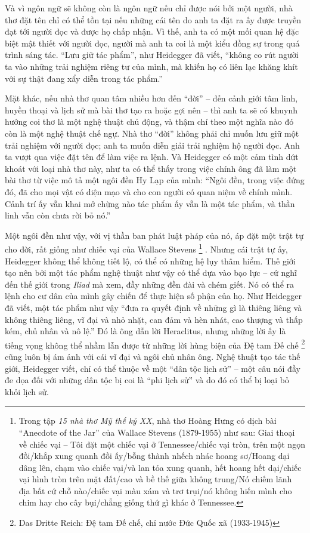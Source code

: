 \documentclass[../main.tex]{subfiles}
\begin{document}
\begin{multicols}{2}
Và vì ngôn ngữ sẽ không còn là ngôn ngữ nếu chỉ được nói bởi một người, nhà thơ đặt tên chỉ có thể tồn tại nếu những cái tên do anh ta đặt ra ấy được truyền đạt tới người đọc và được họ chấp nhận. Vì thế, anh ta có một mối quan hệ đặc biệt mật thiết với người đọc, người mà anh ta coi là một kiểu đồng sự trong quá trình sáng tác. “Lưu giữ tác phẩm”, như Heidegger đã viết, “không co rút người ta vào những trải nghiệm riêng tư của mình, mà khiến họ có liên lạc khăng khít với sự thật đang xẩy diễn trong tác phẩm.” 

Mặt khác, nếu nhà thơ quan tâm nhiều hơn đến “đời” – đến cảnh giới tâm linh, huyền thoại và lịch sử mà bài thơ tạo ra hoặc gợi nên – thì anh ta sẽ có khuynh hướng coi thơ là một nghệ thuật chủ động, và thậm chí theo một nghĩa nào đó còn là một nghệ thuật chế ngự. Nhà thơ “đời” không phải chỉ muốn lưu giữ một trải nghiệm với người đọc; anh ta muốn diễn giải trải nghiệm hộ người đọc. Anh ta vượt qua việc đặt tên để làm việc ra lệnh. Và Heidegger có một cảm tình dứt khoát với loại nhà thơ này, như ta có thể thấy trong việc chính ông đã làm một bài thơ từ việc mô tả một ngôi đền Hy Lạp của mình: “Ngôi đền, trong việc đứng đó, đã cho mọi vật có diện mạo và cho con người có quan niệm về chính mình. Cảnh trí ấy vẫn khai mở chừng nào tác phẩm ấy vẫn là một tác phẩm, và thần linh vẫn còn chưa rời bỏ nó.” 

Một ngôi đền như vậy, với vị thần ban phát luật pháp của nó, áp đặt một trật tự cho đời, rất giống như chiếc vại của Wallace Stevens \footnote{
Trong tập \textit{15 nhà thơ Mỹ thế kỷ XX}, nhà thơ Hoàng Hưng có dịch bài “Anecdote of the Jar” của Wallace Stevens (1879-1955) như sau: Giai thoại về chiếc vại – Tôi đặt một chiếc vại ở Tennessee/chiếc vại tròn, trên một ngọn đồi/khắp xung quanh đồi ấy/bỗng thành nhếch nhác hoang sơ/Hoang dại dâng lên, chạm vào chiếc vại/và lan tỏa xung quanh, hết hoang hết dại/chiếc vại hình tròn trên mặt đất/cao và bề thế giữa không trung/Nó chiếm lãnh địa bất cứ chỗ nào/chiếc vại màu xám và trơ trụi/nó không hiến mình cho chim hay cho cây bụi/chẳng giống thứ gì khác ở Tennessee.} . Nhưng cái trật tự ấy, Heidegger không thể không tiết lộ, có thể có những hệ lụy thâm hiểm. Thế giới tạo nên bởi một tác phẩm nghệ thuật như vậy có thể dựa vào bạo lực – cứ nghĩ đến thế giới trong \textit{Iliad} mà xem, đầy những đền đài và chém giết. Nó có thể ra lệnh cho cư dân của mình gây chiến để thực hiện số phận của họ. Như Heidegger đã viết, một tác phẩm như vậy “đưa ra quyết định về những gì là thiêng liêng và không thiêng liêng, vĩ đại và nhỏ nhặt, can đảm và hèn nhát, cao thượng và thấp kém, chủ nhân và nô lệ.” Đó là ông dẫn lời Heraclitus, nhưng những lời ấy là tiếng vọng không thể nhầm lẫn được từ những lời hùng biện của Đệ tam Đế chế \footnote{
Das Dritte Reich: Đệ tam Đế chế, chỉ nước Đức Quốc xã (1933-1945)} cũng luôn bị ám ảnh với cái vĩ đại và ngôi chủ nhân ông. Nghệ thuật tạo tác thế giới, Heidegger viết, chỉ có thể thuộc về một “dân tộc lịch sử” – một câu nói đầy đe dọa đối với những dân tộc bị coi là “phi lịch sử” và do đó có thể bị loại bỏ khỏi lịch sử. 


\end{multicols}
\end{document}
